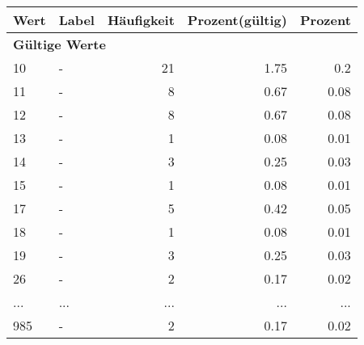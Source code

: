      \begin{longtable}{lXrrr}
     \toprule
     \textbf{Wert} & \textbf{Label} & \textbf{Häufigkeit} & \textbf{Prozent(gültig)} & \textbf{Prozent} \\
     \endhead
     \midrule
     \multicolumn{5}{l}{\textbf{Gültige Werte}}\\
        10 & \multicolumn{1}{X}{-} & %
          \num{21} &
          \num[round-mode=places,round-precision=2]{1.75} &
          \num[round-mode=places,round-precision=2]{0.2} \\
        11 & \multicolumn{1}{X}{-} & %
          \num{8} &
          \num[round-mode=places,round-precision=2]{0.67} &
          \num[round-mode=places,round-precision=2]{0.08} \\
        12 & \multicolumn{1}{X}{-} & %
          \num{8} &
          \num[round-mode=places,round-precision=2]{0.67} &
          \num[round-mode=places,round-precision=2]{0.08} \\
        13 & \multicolumn{1}{X}{-} & %
          \num{1} &
          \num[round-mode=places,round-precision=2]{0.08} &
          \num[round-mode=places,round-precision=2]{0.01} \\
        14 & \multicolumn{1}{X}{-} & %
          \num{3} &
          \num[round-mode=places,round-precision=2]{0.25} &
          \num[round-mode=places,round-precision=2]{0.03} \\
        15 & \multicolumn{1}{X}{-} & %
          \num{1} &
          \num[round-mode=places,round-precision=2]{0.08} &
          \num[round-mode=places,round-precision=2]{0.01} \\
        17 & \multicolumn{1}{X}{-} & %
          \num{5} &
          \num[round-mode=places,round-precision=2]{0.42} &
          \num[round-mode=places,round-precision=2]{0.05} \\
        18 & \multicolumn{1}{X}{-} & %
          \num{1} &
          \num[round-mode=places,round-precision=2]{0.08} &
          \num[round-mode=places,round-precision=2]{0.01} \\
        19 & \multicolumn{1}{X}{-} & %
          \num{3} &
          \num[round-mode=places,round-precision=2]{0.25} &
          \num[round-mode=places,round-precision=2]{0.03} \\
        26 & \multicolumn{1}{X}{-} & %
          \num{2} &
          \num[round-mode=places,round-precision=2]{0.17} &
          \num[round-mode=places,round-precision=2]{0.02} \\
       ... & ... & ... & ... & ... \\
        985 & \multicolumn{1}{X}{-} & %
          \num{2} &
          \num[round-mode=places,round-precision=2]{0.17} &
          \num[round-mode=places,round-precision=2]{0.02} \\


\end{longtable}
